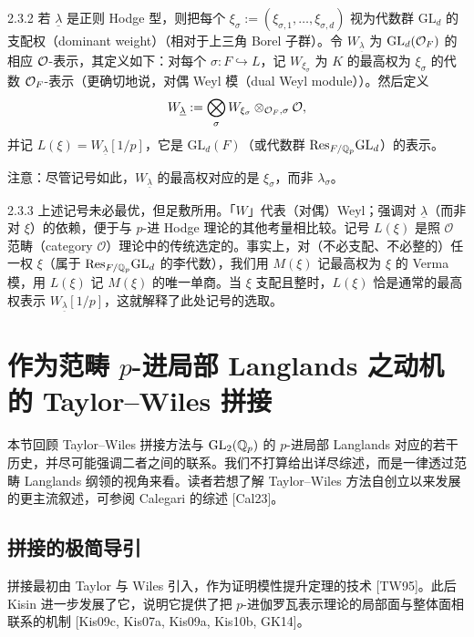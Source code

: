 \begin{defn}{2.3.2}\label{defn:a4-2-3-2}
若 $\underline{\lambda}$ 是正则 Hodge 型，则把每个 $\xi_\sigma:=(\xi_{\sigma,1},\dots,\xi_{\sigma,d})$ 视为代数群 $\mathrm{GL}_d$ 的支配权（dominant weight）（相对于上三角 Borel 子群）。令 $W_{\underline{\lambda}}$ 为 $\mathrm{GL}_d(\mathcal{O}_F)$ 的相应 $\mathcal{O}$-表示，其定义如下：对每个 $\sigma:F\hookrightarrow L$，记 $W_{\xi_\sigma}$ 为 $K$ 的最高权为 $\xi_\sigma$ 的代数 $\mathcal{O}_F$-表示（更确切地说，对偶 Weyl 模（dual Weyl module））。然后定义
\[
W_{\underline{\lambda}}:=\bigotimes_\sigma W_{\xi_\sigma}\otimes_{\mathcal{O}_F,\sigma}\mathcal{O},
\]
并记 $L(\xi)=W_{\underline{\lambda}}[1/p]$，它是 $\mathrm{GL}_d(F)$（或代数群 $\mathrm{Res}_{F/\mathbb{Q}_p}\mathrm{GL}_d$）的表示。
\end{defn}

注意：尽管记号如此，$W_{\underline{\lambda}}$ 的最高权对应的是 $\xi_\sigma$，而非 $\lambda_\sigma$。

\begin{rem}{2.3.3}\label{rem:a4-2-3-3}
上述记号未必最优，但足敷所用。「$W$」代表（对偶）Weyl；强调对 $\underline{\lambda}$（而非对 $\xi$）的依赖，便于与 $p$-进 Hodge 理论的其他考量相比较。记号 $L(\xi)$ 是照 $\mathcal{O}$ 范畴（category $\mathcal{O}$）理论中的传统选定的。事实上，对（不必支配、不必整的）任一权 $\xi$（属于 $\mathrm{Res}_{F/\mathbb{Q}_p}\mathrm{GL}_d$ 的李代数），我们用 $M(\xi)$ 记最高权为 $\xi$ 的 Verma 模，用 $L(\xi)$ 记 $M(\xi)$ 的唯一单商。当 $\xi$ 支配且整时，$L(\xi)$ 恰是通常的最高权表示 $W_{\underline{\lambda}}[1/p]$，这就解释了此处记号的选取。
\end{rem}

\section{作为范畴 $p$-进局部 Langlands 之动机的 Taylor--Wiles 拼接}

本节回顾 Taylor--Wiles 拼接方法与 $\mathrm{GL}_2(\mathbb{Q}_p)$ 的 $p$-进局部 Langlands 对应的若干历史，并尽可能强调二者之间的联系。我们不打算给出详尽综述，而是一律透过范畴 Langlands 纲领的视角来看。读者若想了解 Taylor--Wiles 方法自创立以来发展的更主流叙述，可参阅 Calegari 的综述 [Cal23]。

\subsection{拼接的极简导引}

拼接最初由 Taylor 与 Wiles 引入，作为证明模性提升定理的技术 [TW95]。此后 Kisin 进一步发展了它，说明它提供了把 $p$-进伽罗瓦表示理论的局部面与整体面相联系的机制 [Kis09c, Kis07a, Kis09a, Kis10b, GK14]。

